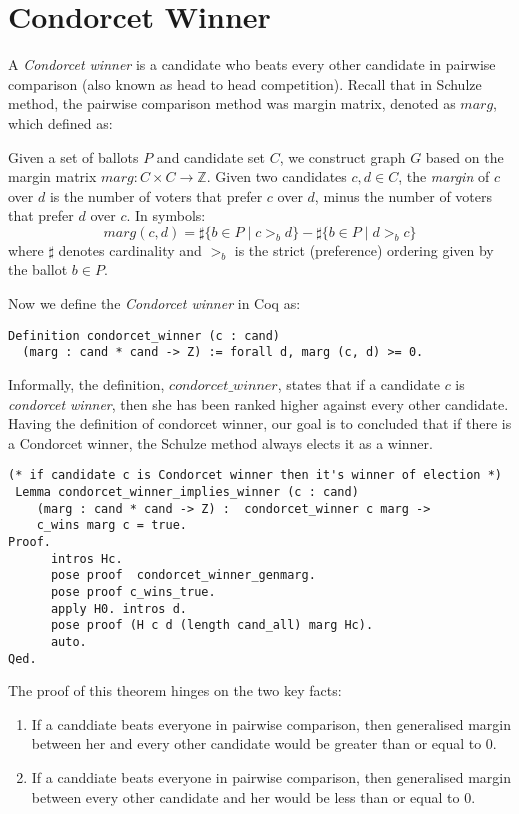  \section{Condorcet Winner}
	A \textit{Condorcet winner} is a candidate who beats every other candidate in pairwise comparison (also known as head to head competition). 
	Recall that in Schulze method, the pairwise comparison method was margin matrix, denoted as $marg$, which defined as:
	\begin{displayquote}
	Given a set of ballots $P$ and candidate set $C$, we construct graph $G$ based on the margin matrix $marg: C \times C \to \mathbb{Z}$. Given two candidates $c, d \in C$,
the \emph{margin} of $c$ over $d$ is
the number of voters that prefer $c$ over $d$, minus the number of voters that prefer $d$ over $c$. 
In symbols:
\[
  marg(c, d) = \sharp \lbrace b \in P \mid c >_b d \rbrace -
            \sharp \lbrace b \in P \mid d >_b c \rbrace
\] where $\sharp$ denotes cardinality and $>_b$ is the strict
(preference) ordering given by the ballot $b \in P$.
 
 \end{displayquote}
  
\noindent	 
Now we define the \textit{Condorcet winner} in Coq as:
 \begin{verbatim}
Definition condorcet_winner (c : cand) 
  (marg : cand * cand -> Z) := forall d, marg (c, d) >= 0.
\end{verbatim}

  Informally, the definition,  $condorcet\_winner$, states that 
  if a candidate $c$  is \textit{condorcet winner}, then she has been ranked higher against
  every other candidate.  Having the definition of  condorcet winner, our goal is to concluded that if there is 
 	a Condorcet winner, the Schulze method always elects it as a winner.  
 	
\begin{verbatim}
(* if candidate c is Condorcet winner then it's winner of election *)
 Lemma condorcet_winner_implies_winner (c : cand) 
    (marg : cand * cand -> Z) :  condorcet_winner c marg ->
    c_wins marg c = true. 
Proof.
      intros Hc. 
      pose proof  condorcet_winner_genmarg.
      pose proof c_wins_true.
      apply H0. intros d.
      pose proof (H c d (length cand_all) marg Hc).
      auto.
Qed.
\end{verbatim}
 		
 The proof of this theorem hinges on the two key facts:
 \begin{enumerate}
  \item If a canddiate beats everyone in pairwise comparison, then generalised margin between her and every other candidate would 
      be  greater than or equal to 0.
  \item If a canddiate beats everyone in pairwise comparison, then generalised margin between every other candidate and her would 
      be  less than or equal to 0.
 \end{enumerate}
 
